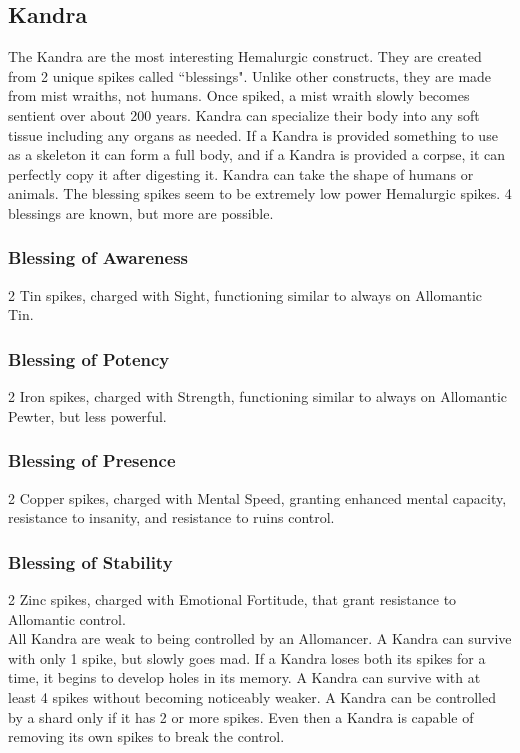 \documentclass[conference]{IEEEtran}
\begin{document}
\subsection*{Kandra}
The Kandra are the most interesting Hemalurgic construct.  They are created from 2 unique spikes called ``blessings".\cite{WoF}\cite{SoS-CH7}  Unlike other constructs, they are made from mist wraiths, not humans.\cite{WoF}  Once spiked, a mist wraith slowly becomes sentient over about 200 years.\cite{HoA-CH9}\cite{TFE-CH17}  Kandra can specialize their body into any soft tissue including any organs as needed.\cite{HoA-CH2}  If a Kandra is provided something to use as a skeleton it can form a full body, and if a Kandra is provided a corpse, it can perfectly copy it after digesting it.\cite{WoA-CH6}  Kandra can take the shape of humans\cite{TFE-CH5} or animals.\cite{WoA-CH6}
The blessing spikes seem to be extremely low power Hemalurgic spikes.\cite{kandra-blessing}\cite{WoF}  4 blessings are known, but more are possible.
\subsubsection*{Blessing of Awareness}
2 Tin spikes, charged with Sight, functioning similar to always on Allomantic Tin.\cite{WoF}\cite{kandra-blessing}\cite{HE-TB}
\subsubsection*{Blessing of Potency}
2 Iron spikes, charged with Strength, functioning similar to always on Allomantic Pewter, but less powerful.\cite{WoF}\cite{kandra-blessing}\cite{HE-TB}
\subsubsection*{Blessing of Presence}
2 Copper spikes, charged with Mental Speed, granting enhanced mental capacity, resistance to insanity, and resistance to ruins control.\cite{WoF}\cite{HoA-CH24}\cite{kandra-presence}\cite{kandra-blessing}\cite{HE-TB}
\subsubsection*{Blessing of Stability}
2 Zinc spikes, charged with Emotional Fortitude, that grant resistance to Allomantic control.\cite{WoF}\cite{kandra-blessing}\cite{HE-TB}\\

All Kandra are weak to being controlled by an Allomancer.\cite{WoA-CH40}
A Kandra can survive with only 1 spike,\cite{SoS-CH7} but slowly goes mad.  \cite{SoS-CH7}
If a Kandra loses both its spikes for a time, it begins to develop holes in its memory.\cite{BoM-CH30}
A Kandra can survive with at least 4 spikes without becoming noticeably weaker.\cite{HoA-CH20}
A Kandra can be controlled by a shard only if it has 2 or more spikes.\cite{SoS-CH7}\cite{SoS-CH26}  Even then a Kandra is capable of removing its own spikes to break the control.\cite{HoA-CH77}
\end{document}
